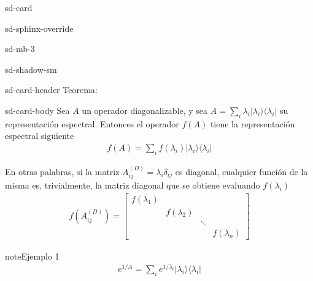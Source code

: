 \documentclass[letterpaper,10pt,english]{jupyterBook}
\newcommand{\bra}[1]{\langle #1|}
\newcommand{\ket}[1]{|#1\rangle}
\begin{document}
\begin{sphinxuseclass}{sd-card}
\begin{sphinxuseclass}{sd-sphinx-override}
\begin{sphinxuseclass}{sd-mb-3}
\begin{sphinxuseclass}{sd-shadow-sm}
\begin{sphinxuseclass}{sd-card-header}
\sphinxAtStartPar
Teorema:

\end{sphinxuseclass}
\begin{sphinxuseclass}{sd-card-body}
\sphinxAtStartPar
Sea \(A\) un operador diagonalizable, y sea \(A= \sum_i \lambda_i \ket{\lambda_i}\bra{\lambda_i}\) su representación espectral.
Entonces el operador \(f(A)\) tiene la representación espectral siguiente
\begin{equation*}
\begin{split}
f(A) = \sum_i f(\lambda_i) \ket{\lambda_i}\bra{\lambda_i}
\end{split}
\end{equation*}
\end{sphinxuseclass}
\end{sphinxuseclass}
\end{sphinxuseclass}
\end{sphinxuseclass}
\end{sphinxuseclass}
\sphinxAtStartPar
En otras palabras, si la matriz \(A^{(D)}_{ij} = \lambda_i \delta_{ij} \) es diagonal, cualquier función de la misma es, trivialmente, la matriz diagonal que se obtiene evaluando \(f(\lambda_i)\)
\begin{equation*}
\begin{split}
f(A^{(D)}_{ij}) = \begin{bmatrix} f(\lambda_1)& &  & \\ & f(\lambda_2) & &  \\ & & \ddots & \\ & & & f(\lambda_n)\end{bmatrix}
\end{split}
\end{equation*}
\begin{sphinxadmonition}{note}{Ejemplo 1}
\begin{equation*}
\begin{split}e^{1/A} = \sum_i e^{1/\lambda_i} \ket{\lambda_i}\bra{\lambda_i}\end{split}
\end{equation*}\end{sphinxadmonition}
\end{document}
